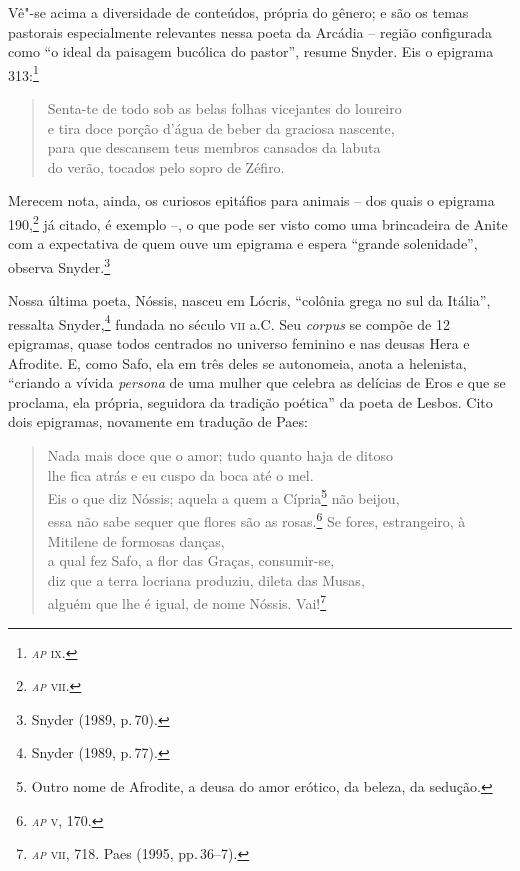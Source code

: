 Vê"-se acima a diversidade de conteúdos, própria do gênero; e são os temas
pastorais especialmente relevantes nessa poeta da Arcádia -- região configurada
como “o ideal da paisagem bucólica do pastor”, resume Snyder. Eis o epigrama
313:\footnote{\textit{\textsc{ap}} \textsc{ix}.}

\begin{verse}
\small{Senta-te de todo sob as belas folhas vicejantes do loureiro\\
e tira doce porção d’água de beber da graciosa nascente,\\
para que descansem teus membros cansados da labuta\\
do verão, tocados pelo sopro de Zéfiro.}
\end{verse}

\pagebreak

Merecem nota, ainda, os curiosos epitáfios para animais -- dos quais o epigrama
190,\footnote{\textit{\textsc{ap}} \textsc{vii}.} já citado, é exemplo --, o que pode ser visto como uma
brincadeira de Anite com a expectativa de quem ouve um epigrama e espera
“grande solenidade”, observa Snyder.\footnote{ Snyder (1989, p.\,70).} 

Nossa última poeta, Nóssis, nasceu em Lócris, “colônia grega no sul da Itália”,
ressalta Snyder,\footnote{Snyder (1989, p.\,77).} fundada no século \textsc{vii} a.C. Seu \textit{corpus} se
compõe de 12 epigramas, quase todos centrados no
universo feminino e nas deusas Hera e Afrodite. E, como Safo, ela em três deles
se autonomeia, anota a helenista, ``criando a vívida \textit{persona} de uma
mulher que celebra as delícias de Eros e que se proclama, ela própria,
seguidora da tradição poética'' da poeta de Lesbos. Cito dois epigramas,
novamente em tradução de Paes:

\begin{verse}
\small{Nada mais doce que o amor; tudo quanto haja de ditoso\\
lhe fica atrás e eu cuspo da boca até o mel.\\
Eis o que diz Nóssis; aquela a quem a Cípria\footnote{ Outro nome de Afrodite, a deusa do amor erótico, da beleza, da sedução.} não beijou,\\
essa não sabe sequer que flores são as rosas.\footnote{\textit{\textsc{ap}} \textsc{v}, 170.}\medskip
Se fores, estrangeiro, à Mitilene de formosas danças,\\
a qual fez Safo, a flor das Graças, consumir-se,\\ 
diz que a terra locriana produziu, dileta das Musas,\\
alguém que lhe é igual, de nome Nóssis. Vai!}\footnote{\textit{\textsc{ap}} \textsc{vii}, 718. Paes (1995, pp.\,36--7).}
\end{verse}

